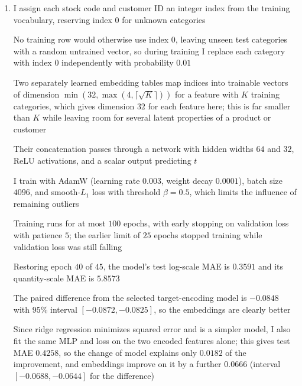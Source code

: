 \documentclass{article}
\begin{document}
\begin{enumerate}[label=\alph*.]
Validation selects the $\log(1+y)$ encoding, whose test MAE is $\boxed{0.4440}$ on the log scale and $6.9483$ on the original scale, against $0.8142$ and $10.2068$ for a constant at the training median

The raw mean performs far worse because a category's mean is dominated by its extreme rows; the two largest quantities, $80995$ and $74215$, are both in the training partition

\item I assign each stock code and customer ID an integer index from the training vocabulary, reserving index $0$ for unknown categories

No training row would otherwise use index $0$, leaving unseen test categories with a random untrained vector, so during training I replace each category with index $0$ independently with probability $0.01$

Two separately learned embedding tables map indices into trainable vectors of dimension $\min(32,\max(4,\lceil\sqrt{K}\rceil))$ for a feature with $K$ training categories, which gives dimension $32$ for each feature here; this is far smaller than $K$ while leaving room for several latent properties of a product or customer

Their concatenation passes through a network with hidden widths $64$ and $32$, ReLU activations, and a scalar output predicting $t$

I train with AdamW (learning rate $0.003$, weight decay $0.0001$), batch size $4096$, and smooth-$L_1$ loss with threshold $\beta=0.5$, which limits the influence of remaining outliers

Training runs for at most $100$ epochs, with early stopping on validation loss with patience $5$; the earlier limit of $25$ epochs stopped training while validation loss was still falling

Restoring epoch $40$ of $45$, the model's test log-scale MAE is $\boxed{0.3591}$ and its quantity-scale MAE is $5.8573$

The paired difference from the selected target-encoding model is $-0.0848$ with $95\%$ interval $[-0.0872,-0.0825]$, so the embeddings are clearly better

Since ridge regression minimizes squared error and is a simpler model, I also fit the same MLP and loss on the two encoded features alone; this gives test MAE $0.4258$, so the change of model explains only $0.0182$ of the improvement, and embeddings improve on it by a further $0.0666$ (interval $[-0.0688,-0.0644]$ for the difference)


\end{enumerate}
\end{document}
